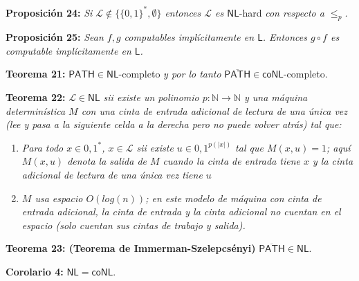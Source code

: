 \documentclass{article}
\begin{document}
\begin{flushleft}
  \textbf{Proposición 24:}
  \textit{Si $\mathcal{L} \not\in \{\{0,1\}^*, \emptyset\}$ entonces $\mathcal{L}$ es $\mathsf{NL}$}-hard
  \textit{con respecto a $\leq_p$.}
\end{flushleft}

\begin{flushleft}
  \textbf{Proposición 25:}
  \textit{Sean $f,g$ computables implícitamente en $\mathsf{L}$. Entonces $g \circ f$ es computable 
  implícitamente en $\mathsf{L}$.}
\end{flushleft}

\begin{flushleft}
  \textbf{Teorema 21:}
  $\mathsf{PATH} \in \mathsf{NL}$-completo \textit{y por lo tanto} $\overline{\mathsf{PATH}} \in \mathsf{coNL}$-completo.
\end{flushleft}

\begin{flushleft}
  \textbf{Teorema 22:}
  \textit{$\mathcal{L} \in \mathsf{NL}$ sii existe un polinomio $p : \mathbb{N} \rightarrow \mathbb{N}$ y una
  máquina determinística $M$ con una cinta de entrada adicional de lectura de una única vez (lee y pasa a la 
  siguiente celda a la derecha pero no puede volver atrás) tal que:}
\end{flushleft}
\begin{enumerate}
  \item \textit{Para todo $x \in {0, 1}^*$, $x \in \mathcal{L}$ sii existe $u \in {0, 1}^{p(|x|)}$ tal que $M (x, u) = 
  1$; aquí $M (x, u)$ denota la salida de $M$ cuando la cinta de entrada tiene $x$ y la cinta adicional de lectura 
  de una única vez tiene $u$}
  \item \textit{$M$ usa espacio $O(log(n))$; en este modelo de máquina con cinta de entrada adicional, la cinta de entrada 
  y la cinta adicional no cuentan en el espacio (solo cuentan sus cintas de trabajo y salida).}
\end{enumerate}

\begin{flushleft}
  \textbf{Teorema 23: \hypertarget{immerman}{\textcolor{Bittersweet}{(Teorema de Immerman-Szelepcsényi)}}}
  $\overline{\mathsf{PATH}} \in \mathsf{NL}$.
\end{flushleft}

\begin{flushleft}
  \textbf{Corolario 4:}
  $\mathsf{NL} = \mathsf{coNL}$.
\end{flushleft}
\end{document}

